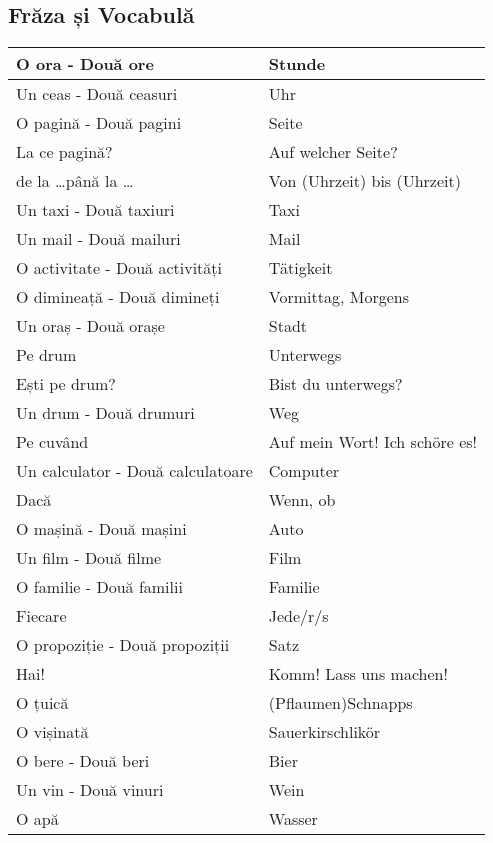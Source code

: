 \documentclass[11pt, oneside]{article}
\begin{document}
\subsection{Frăza și Vocabulă}
\begin{center}
  \begin{tabular}{ | p{6cm}| p{6cm} | } 
    \hline
    O ora - Două ore & Stunde\\
    \hline
    Un ceas - Două ceasuri & Uhr\\
    \hline
    O pagină - Două pagini & Seite\\
    \hline
    La ce pagină? & Auf welcher Seite?\\
    \hline
    de la \dots până la \dots & Von (Uhrzeit) bis (Uhrzeit)\\
    \hline
    Un taxi - Două taxiuri & Taxi\\
    \hline
    Un mail - Două mailuri & Mail\\
    \hline
    O activitate - Două activități & Tätigkeit\\
    \hline
    O dimineață - Două dimineți & Vormittag, Morgens\\
    \hline
    Un oraș - Două orașe & Stadt\\
    \hline
    Pe drum & Unterwegs\\
    \hline
    Ești pe drum? & Bist du unterwegs?\\
    \hline
    Un drum - Două drumuri & Weg\\
    \hline
    Pe cuvând & Auf mein Wort! Ich schöre es!\\
    \hline
    Un calculator - Două calculatoare & Computer\\
    \hline
    Dacă & Wenn, ob\\
    \hline
    O mașină - Două mașini & Auto\\
    \hline
    Un film - Două filme & Film\\
    \hline
    O familie - Două familii & Familie\\
    \hline
    Fiecare & Jede/r/s\\
    \hline
    O propoziție - Două propoziții & Satz\\
    \hline
    Hai! & Komm! Lass uns machen!\\
    \hline
    O țuică & (Pflaumen)Schnapps\\
    \hline
    O vișinată & Sauerkirschlikör\\
    \hline
    O bere - Două beri & Bier\\
    \hline
    Un vin - Două vinuri & Wein\\
    \hline
    O apă & Wasser\\
    \hline
  \end{tabular}
\end{center}
\end{document}
